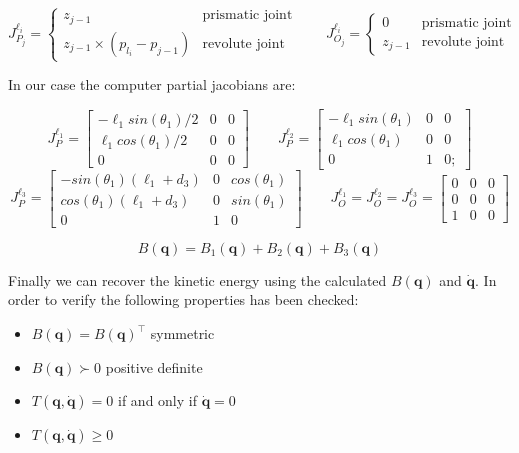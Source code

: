 \documentclass[a4paper,12pt]{article}
\renewcommand*{\l}{\ell}
\newcommand*{\q}{\bm{q}}
\newcommand*{\dotq}{\dot{\q}}
\begin{document}
\[
    J^{\l_i}_{P_j} = \begin{cases}
       z_{j-1} & \text{prismatic joint} \\
       z_{j-1} \times (p_{l_i}- p_{j-1}) & \text{revolute joint} 
      \end{cases}
    \qquad
    J^{\l_i}_{O_j} = \begin{cases}
    0 & \text{prismatic joint} \\
    z_{j-1} & \text{revolute joint} 
    \end{cases}
\]

\noindent In our case the computer partial jacobians are:

\[
    J^{\l_1}_{P} = \begin{bmatrix}
        -\l_1sin(\theta_1)/2 & 0 & 0 \\
 \l_1cos(\theta_1)/2 &0 &0 \\
               0 &0 &0
    \end{bmatrix}
    \qquad
    J^{\l_2}_{P} = \begin{bmatrix}
        - \l_1sin(\theta_1) &0 &0\\
\l_1cos(\theta_1) & 0 &0\\
                            0& 1& 0;
    \end{bmatrix}
\]
\[
    J^{\l_3}_{P} = \begin{bmatrix}
        -sin(\theta_1)(\l_1 + d_3) &0 & cos(\theta_1)\\
 cos(\theta_1)(\l_1 + d_3) &0 &sin(\theta_1)\\
                          0 &1 &      0
    \end{bmatrix}
    \qquad
    J^{\l_1}_{O} = J^{\l_2}_{O} = J^{\l_3}_{O} =\begin{bmatrix}
        0 &0 &0\\ 0& 0 &0\\ 1& 0& 0
    \end{bmatrix}
\]

\[
  B(\textbf{q}) = B_1(\textbf{q}) + B_2(\textbf{q}) +B_3(\textbf{q}) 
\]

\noindent Finally we can recover the kinetic energy using the calculated $B(\textbf{q})$ and $ \dot{\textbf{q}}$. In order to verify the following properties has been checked: 
\bigskip
\begin{itemize}
    \item $B(\q) = B(\q)^\top$ symmetric
    \item $B(\q) \succ 0$ positive definite
    \item $T(\q, \dotq) = 0$ if and only if $ \dotq = 0$
    \item $T(\q, \dotq) \geq 0$
\end{itemize}
\end{document}
